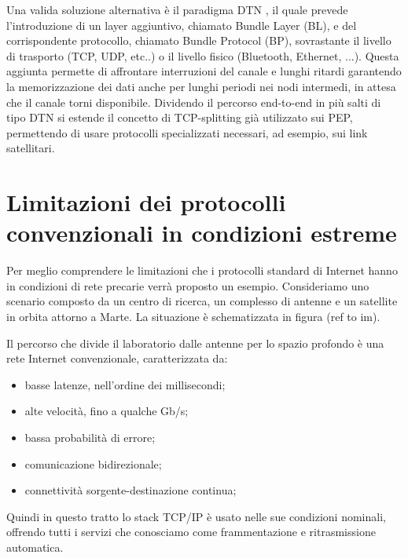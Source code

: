\documentclass[12pt,a4paper,oneside]{book}
\begin{document}
		Una valida soluzione alternativa è il paradigma DTN \cite{caini2011delay}, il quale prevede l'introduzione di un layer aggiuntivo, chiamato Bundle Layer (BL)\cite{cerf2007rfc}, e del corrispondente protocollo, chiamato Bundle Protocol (BP)\cite{scott2007bundle}, sovrastante il livello di trasporto (TCP, UDP, etc..) o il livello fisico (Bluetooth, Ethernet, ...). Questa aggiunta permette di affrontare interruzioni del canale e lunghi ritardi garantendo la memorizzazione dei dati anche per lunghi periodi nei nodi intermedi, in attesa che il canale torni disponibile. Dividendo il percorso end-to-end in più salti di tipo DTN si estende il concetto di TCP-splitting già utilizzato sui PEP, permettendo di usare protocolli specializzati necessari, ad esempio, sui link satellitari.
		
		\section{Limitazioni dei protocolli convenzionali in condizioni estreme} \label{limProt}
		
		Per meglio comprendere le limitazioni che i protocolli standard di Internet hanno in condizioni di rete precarie verrà proposto un esempio. Consideriamo uno scenario composto da un centro di ricerca, un complesso di antenne e un satellite in orbita attorno a Marte. La situazione è schematizzata in figura (ref to im). 
		
		Il percorso che divide il laboratorio dalle antenne per lo spazio profondo è una rete Internet convenzionale, caratterizzata da:
		\begin{itemize}
			\item basse latenze, nell'ordine dei millisecondi;
			\item alte velocità, fino a qualche Gb/s;
			\item bassa probabilità di errore;
			\item comunicazione bidirezionale;
			\item connettività sorgente-destinazione continua;
		\end{itemize}
		Quindi in questo tratto lo stack TCP/IP è usato nelle sue condizioni nominali, offrendo tutti i servizi che conosciamo come frammentazione e ritrasmissione automatica. 
		
\end{document}

